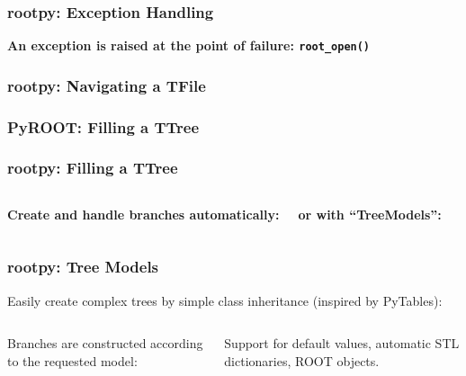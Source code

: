 \documentclass[10pt,professionalfonts,serif,usenames,dvipsnames,svgnames,table]{beamer}
\begin{document}
\begin{frame}[fragile]
    \frametitle{rootpy: Exception Handling}

    
    \vspace{-.5cm}
    
    \begin{center}
        \vspace{-.5cm}
    {\bf An exception is raised at the point of failure:
    \verb|root_open()|}
    \end{center}
\end{frame}

\begin{frame}[fragile]
    \frametitle{rootpy: Navigating a TFile}
    
    \vspace{-.5cm}
    
\end{frame}

\begin{frame}[fragile]
    \frametitle{PyROOT: Filling a TTree}
    
\end{frame}

\begin{frame}[fragile]
    \frametitle{rootpy: Filling a TTree}
    \begin{columns}
        {\bf Create and handle branches automatically:}
        
        {\bf or with ``TreeModels'':}
        
    \end{columns}
\end{frame}

\begin{frame}[fragile]
    \frametitle{rootpy: Tree Models}
    Easily create complex trees by simple class inheritance (inspired by
    PyTables):
    \vspace{-.6cm}
    \begin{columns}
    

    \vspace{.8cm}

    Branches are constructed according to the requested model:
    
    \vspace{-.3cm}
    Support for default values, automatic STL dictionaries, ROOT objects.
    \end{columns}
\end{frame}
\end{document}
